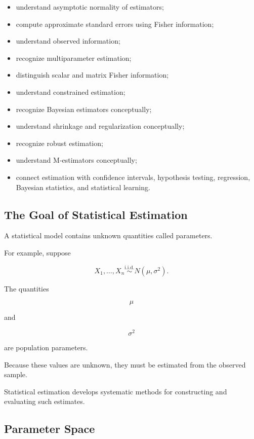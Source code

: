 {\begin{itemize}
    \item understand asymptotic normality of estimators;
    \item compute approximate standard errors using Fisher information;
    \item understand observed information;
    \item recognize multiparameter estimation;
    \item distinguish scalar and matrix Fisher information;
    \item understand constrained estimation;
    \item recognize Bayesian estimators conceptually;
    \item understand shrinkage and regularization conceptually;
    \item recognize robust estimation;
    \item understand M-estimators conceptually;
    \item connect estimation with confidence intervals, hypothesis
          testing, regression, Bayesian statistics, and statistical
          learning.
\end{itemize}
}

\subsection{The Goal of Statistical Estimation}
\label{subsec:goal-statistical-estimation}

A statistical model contains unknown quantities called parameters.

For example, suppose

\[
X_1,\ldots,X_n
\overset{\text{i.i.d.}}{\sim}
N(\mu,\sigma^2).
\]

The quantities

\[
\mu
\]

and

\[
\sigma^2
\]

are population parameters.

Because these values are unknown, they must be estimated from the
observed sample.

Statistical estimation develops systematic methods for constructing and
evaluating such estimates.

\subsection{Parameter Space}
\label{subsec:parameter-space}

